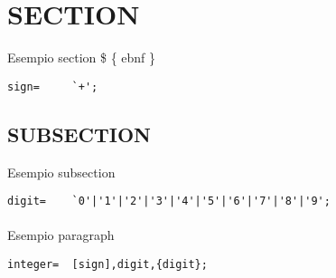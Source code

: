 \documentclass{article}
\begin{document}
    
    \section{SECTION}
      		 
    Esempio section \$ \{ ebnf \} 
    
    \begin{flushleft}
    \begin{lstlisting}[mathescape=true, breaklines=true]
      sign= 	`+';
    \end{lstlisting}
    \end{flushleft}
    
    \subsection{SUBSECTION}
    
    Esempio subsection 
    
    \begin{flushleft}
    \begin{lstlisting}[mathescape=true, breaklines=true]
      digit= 	`0'|'1'|'2'|'3'|'4'|'5'|'6'|'7'|'8'|'9';
    \end{lstlisting}
    \end{flushleft}
    
    \paragraph{}
    
    Esempio paragraph 
    
    \begin{flushleft}
    \begin{lstlisting}[mathescape=true, breaklines=true]
      integer= 	[sign],digit,{digit};
    \end{lstlisting}
    \end{flushleft}
\end{document}
